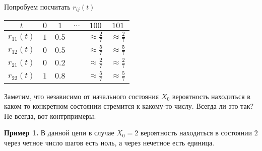 \documentclass[12pt]{article}
\begin{document}
Попробуем посчитать $r_{ij}(t)$

\begin{center}
  \begin{tabular}{c|c|c|c|c|c|}
    $t$ & $0$ & $1$ & $\dots$ & $100$ & $101$ \\ \hline
    $r_{11}(t)$ & $1$ & $0.5$ & & $\approx \frac{2}{7}$ & $\approx \frac{2}{7}$ \\ \hline
    $r_{12}(t)$ & $0$ & $0.5$ & & $\approx \frac{5}{7}$ & $\approx \frac{5}{7}$ \\ \hline
    $r_{21}(t)$ & $0$ & $0.2$ & & $\approx \frac{2}{7}$ & $\approx \frac{2}{7}$ \\ \hline
    $r_{22}(t)$ & $1$ & $0.8$ & & $\approx \frac{5}{7}$ & $\approx \frac{5}{7}$ \\ \hline
  \end{tabular}
\end{center}

Заметим, что независимо от начального состояния $X_0$ вероятность находиться в каком-то конкретном состоянии стремится к какому-то числу. Всегда ли это так? Не всегда, вот контрпримеры.

\textbf{Пример 1.} В данной цепи в случае $X_0 = 2$ вероятность находиться в состоянии $2$ через четное число шагов есть ноль, а через нечетное есть единица.
\begin{center}
\end{center}
\end{document}
